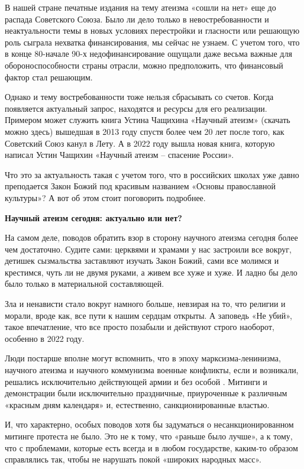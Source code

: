 В нашей стране печатные издания на тему атеизма «сошли на нет» еще до распада Советского Союза. Было ли дело только в невостребованности и неактуальности темы в новых условиях перестройки и гласности или решающую роль сыграла нехватка финансирования, мы сейчас не узнаем. С учетом того, что в конце 80-начале 90-х недофинансирование ощущали даже весьма важные для обороноспособности страны отрасли, можно предположить, что финансовый фактор стал решающим.

Однако и тему востребованности тоже нельзя сбрасывать со счетов. Когда появляется актуальный запрос, находятся и ресурсы для его реализации. Примером может служить книга Устина Чащихина «Научный атеизм» (скачать можно здесь) вышедшая в 2013 году спустя более чем 20 лет после того, как Советский Союз канул в Лету. А в 2022 году вышла новая книга, которую написал Устин Чащихин «Научный атеизм – спасение России».

Что это за актуальность такая с учетом того, что в российских школах уже давно преподается Закон Божий под красивым названием «Основы православной культуры»? А вот об этом стоит поговорить подробнее.

\textbf{Научный атеизм сегодня: актуально или нет?}

На самом деле, поводов обратить взор в сторону научного атеизма сегодня более чем достаточно. Судите сами: церквями и храмами у нас застроили все вокруг, детишек сызмальства заставляют изучать Закон Божий, сами все молимся и крестимся, чуть ли не двумя руками, а живем все хуже и хуже. И ладно бы дело было только в материальной составляющей.

Зла и ненависти стало вокруг намного больше, невзирая на то, что религии и морали, вроде как, все пути к нашим сердцам открыты. А заповедь «Не убий», такое впечатление, что все просто позабыли и действуют строго наоборот, особенно в 2022 году.

Люди постарше вполне могут вспомнить, что в эпоху марксизма-ленинизма, научного атеизма и научного коммунизма военные конфликты, если и возникали, решались исключительно  действующей армии и без особой . Митинги и демонстрации были исключительно праздничные, приуроченные к различным «красным дням календаря» и, естественно, санкционированные властью.

И, что характерно, особых поводов хотя бы задуматься о несанкционированном митинге протеста не было. Это не к тому, что «раньше было лучше», а к тому, что с проблемами, которые есть всегда и в любом государстве, каким-то образом справлялись так, чтобы не нарушать покой «широких народных масс».


